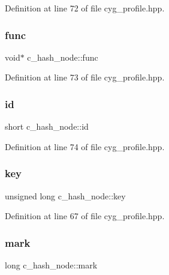 Definition at line 72 of file cyg\+\_\+profile.\+hpp.

\mbox{\label{structc__hash__node_a3b00ec567a576f3677911f8b8e421de0}} 
\subsubsection{\texorpdfstring{func}{func}}
{\footnotesize\ttfamily void$\ast$ c\+\_\+hash\+\_\+node\+::func}



Definition at line 73 of file cyg\+\_\+profile.\+hpp.

\mbox{\label{structc__hash__node_a1ef613164cb42133cc969fa92732cf5f}} 
\subsubsection{\texorpdfstring{id}{id}}
{\footnotesize\ttfamily short c\+\_\+hash\+\_\+node\+::id}



Definition at line 74 of file cyg\+\_\+profile.\+hpp.

\mbox{\label{structc__hash__node_a83dedd9d9f8b425832404116b456b46d}} 
\subsubsection{\texorpdfstring{key}{key}}
{\footnotesize\ttfamily unsigned long c\+\_\+hash\+\_\+node\+::key}



Definition at line 67 of file cyg\+\_\+profile.\+hpp.

\mbox{\label{structc__hash__node_af5199f281a298c18ee13e8fc8a86359e}} 
\subsubsection{\texorpdfstring{mark}{mark}}
{\footnotesize\ttfamily long c\+\_\+hash\+\_\+node\+::mark}



